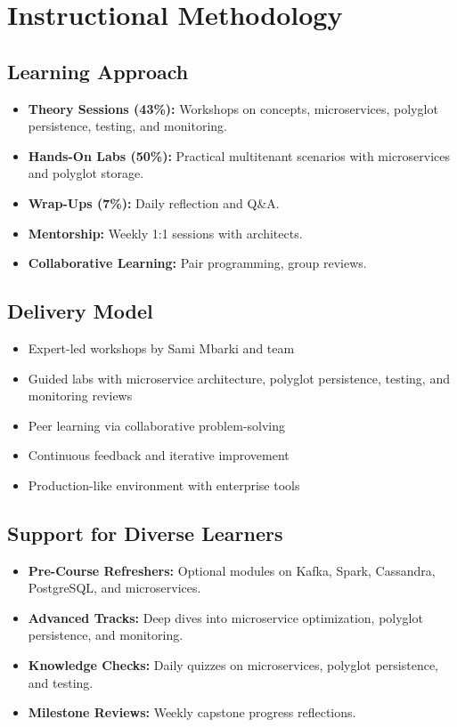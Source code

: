 \documentclass[11pt]{article}
\begin{document}
\section{Instructional Methodology}

\subsection{Learning Approach}
\begin{itemize}
    \item \textbf{Theory Sessions (43\%):} Workshops on concepts, microservices, polyglot persistence, testing, and monitoring.
    \item \textbf{Hands-On Labs (50\%):} Practical multitenant scenarios with microservices and polyglot storage.
    \item \textbf{Wrap-Ups (7\%):} Daily reflection and Q\&A.
    \item \textbf{Mentorship:} Weekly 1:1 sessions with architects.
    \item \textbf{Collaborative Learning:} Pair programming, group reviews.
\end{itemize}

\subsection{Delivery Model}
\begin{itemize}
    \item Expert-led workshops by Sami Mbarki and team
    \item Guided labs with microservice architecture, polyglot persistence, testing, and monitoring reviews
    \item Peer learning via collaborative problem-solving
    \item Continuous feedback and iterative improvement
    \item Production-like environment with enterprise tools
\end{itemize}

\subsection{Support for Diverse Learners}
\begin{itemize}
    \item \textbf{Pre-Course Refreshers:} Optional modules on Kafka, Spark, Cassandra, PostgreSQL, and microservices.
    \item \textbf{Advanced Tracks:} Deep dives into microservice optimization, polyglot persistence, and monitoring.
    \item \textbf{Knowledge Checks:} Daily quizzes on microservices, polyglot persistence, and testing.
    \item \textbf{Milestone Reviews:} Weekly capstone progress reflections.
\end{itemize}
\end{document}
